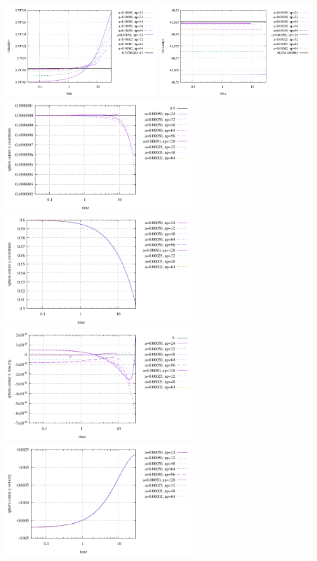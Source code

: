 \begin{center}
\includegraphics[width=5.7cm]{python_codes/fieldstone_93/results_exp2/avrg_density}
\includegraphics[width=5.7cm]{python_codes/fieldstone_93/results_exp2/avrg_viscosity}\\
\includegraphics[width=7cm]{python_codes/fieldstone_93/results_exp2/center_position_x}
\includegraphics[width=7cm]{python_codes/fieldstone_93/results_exp2/center_position_y}\\
\includegraphics[width=7cm]{python_codes/fieldstone_93/results_exp2/center_velocity_x}
\includegraphics[width=7cm]{python_codes/fieldstone_93/results_exp2/center_velocity_y}\\

\end{center}
